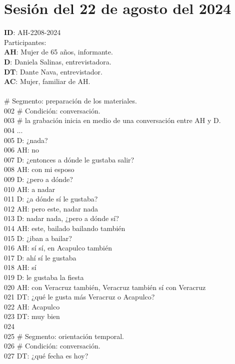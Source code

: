 \section{Sesión del 22 de agosto del 2024}
\noindent
\textbf{ID}: AH-2208-2024\\
Participantes:\\
\textbf{AH}: Mujer de 65 años, informante.\\
\textbf{D}: Daniela Salinas, entrevistadora.\\
\textbf{DT}: Dante Nava, entrevistador.\\
\textbf{AC}: Mujer, familiar de AH.\\
\\
 \# Segmento: preparación de los materiales.\\
002 \# Condición: conversación.\\
003 \# la grabación inicia en medio de una conversación entre AH y D.\\
004 ...\\
005 D: ¿nada?\\
006 AH: no\\
007 D: ¿entonces a dónde le gustaba salir?\\
008 AH: con mi esposo\\
009 D: ¿pero a dónde?\\
010 AH: a nadar\\
011 D: ¿a dónde sí le gustaba?\\
012 AH: pero este, nadar nada\\
013 D: nadar nada, ¿pero a dónde sí?\\
014 AH: este, bailado bailando también\\
015 D: ¿iban a bailar?\\
016 AH: sí sí, en Acapulco también\\
017 D: ahí sí le gustaba\\
018 AH: sí\\
019 D: le gustaba la fiesta\\
020 AH: con Veracruz también, Veracruz también sí con Veracruz\\
021 DT: ¿qué le gusta más Veracruz o Acapulco?\\
022 AH: Acapulco\\
023 DT: muy bien\\
024 \\
025 \# Segmento: orientación temporal.\\
026 \# Condición: conversación.\\
027 DT: ¿qué fecha es hoy?\\
